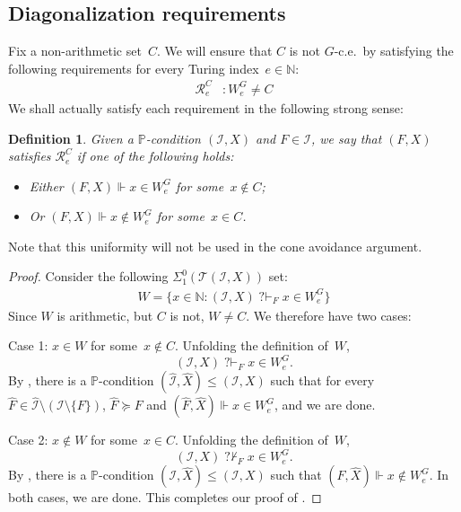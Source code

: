 \documentclass{article}
\def\PP{\mathbb{P}}
\def\Tc{\mathcal{T}}
\def\I{\mathcal{I}}
\def\Rc{\mathcal{R}}
\newcommand{\qvdash}{\operatorname{{?}{\vdash}}}
\newcommand{\nqvdash}{\operatorname{{?}{\nvdash}}}
\newcommand{\NN}[0]{\mathbb{N}}
\def\h#1{\hat{#1}}
\numberwithin{theorem}{section}
\newtheorem{lemma}[theorem]{Lemma}
\newtheorem{definition}[theorem]{Definition}
\begin{document}
\subsection{Diagonalization requirements}

Fix a non-arithmetic set~$C$. We will ensure that $C$ is not $G$-c.e.\ by satisfying the following requirements for every Turing index~$e \in \NN$:
\begin{align*}
\Rc^C_e & : W^G_e \neq C
\end{align*}
We shall actually satisfy each requirement in the following strong sense:

\begin{definition}
Given a $\PP$-condition $(\I, X)$ and $F \in \I$, we say that \emph{$(F, X)$ satisfies $\Rc^C_e$} if one of the following holds:
\begin{itemize}
    \item[(1)] Either $(F, X) \Vdash x \in W^G_e$ for some~$x \not \in C$;
    \item[(2)] Or $(F, X) \Vdash x \not \in W^G_e$ for some~$x \in C$.
\end{itemize}
\end{definition}

Note that this uniformity will not be used in the cone avoidance argument.

\begin{proof}
Consider the following $\Sigma^0_1(\Tc(\I, X))$ set:
\begin{align*}
W = \{ x \in \NN : (\I, X) \qvdash_F x \in W_e^G \}
\end{align*}
Since $W$ is arithmetic, but $C$ is not, $W \neq C$.
We therefore have two cases:
\smallskip

\noindent
Case 1: $x \in W$ for some~$x \not \in C$. Unfolding the definition of~$W$, 
$$(\I, X) \qvdash_F x \in W_e^G.$$
By , there is a $\PP$-condition $(\h \I, \h X) \leq (\I, X)$ such that for every~$\h F \in \h \I \setminus (\I \setminus \{F\})$, $\h F \succeq F$ and $(\h F, \h X) \Vdash x \in W_e^G$, and we are done.
\smallskip

\noindent
Case 2: $x \not \in W$ for some~$x \in C$. Unfolding the definition of~$W$, 
$$(\I, X) \nqvdash_F x \in W_e^G.$$
By , there is a $\PP$-condition $(\I, \h X) \leq (\I, X)$ such that $(F, \h X) \Vdash x \not \in W^G_e$.
In both cases, we are done. This completes our proof of .
\end{proof}
\end{document}
